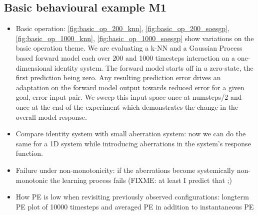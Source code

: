 \documentclass[11pt]{llncs}
\begin{document}
\subsection{Basic behavioural example M1}
\label{sec:exprs_basic_ex_m1}

\begin{itemize}
\item Basic operation:
  \autoref{fig:basic_op_200_knn}, \autoref{fig:basic_op_200_soesgp},
  \autoref{fig:basic_op_1000_knn}, \autoref{fig:basic_op_1000_soesgp}
  show variations on the basic operation theme. We are evaluating a
  k-NN and a Gaussian Process based forward model each over 200 and
  1000 timesteps interaction on a one-dimensional identity system. The
  forward model starts off in a zero-state, the first prediction being
  zero. Any resulting prediction error drives an adaptation on the
  forward model output towards reduced error for a given goal, error
  input pair. We sweep this
  input space once at numsteps/2 and once at the end of the
  experiment which demonstrates the change in the overall model
  response.
  \item Compare identity system with small aberration system: now we
    can do the same for a 1D system while introducing aberrations in
    the system's response function.
  \item Failure under non-monotonicity: if the aberrations become
    systemically non-monotonic the learning process fails (FIXME: at least I
    predict that ;)
\item How PE is low when revisiting previously observed
  configurations: longterm PE plot of 10000 timesteps and averaged PE
  in addition to instantaneous PE
\end{itemize}

\end{document}
